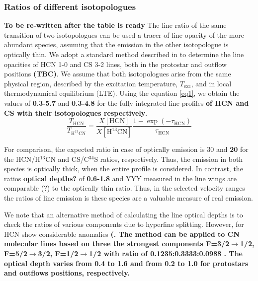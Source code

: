 \documentclass{aa}
\begin{document}
\subsubsection{Ratios of different isotopologues}
\textbf{To be re-written after the table is ready} 
The line ratio of the same transition of two isotopologues can be used a tracer of 
line opacity of the more abundant species, assuming that the emission in the 
other isotopologue is optically thin. We adopt a standard method described in \citep{Gol84} 
to determine the line opacities of HCN 1-0 and CS 3-2 lines, both in the protostar 
and outflow positions \textbf{(TBC)}. We assume that both isotopologues arise from the 
same physical region, described by the excitation temperature, $T_\mathrm{exc}$, and 
in local thermodynamical equilibrium (LTE). Using the equation \ref{eq1}, we obtain
the values of \textbf{0.3-5.7} and \textbf{0.3-4.8} for the fully-integrated line profiles \textbf{of HCN and CS with their isotopologues respectively}.
\begin{equation} 
\label{eq1} \frac{T_{\mathrm{HCN}}}{T_{\mathrm{H^{13}CN}}} =
\frac{X[\mathrm{HCN}]}{X[\mathrm{H^{13}CN}]} \frac
{1-\exp(-\tau_{\mathrm{HCN}})}{\tau_{\mathrm{HCN}}} 
\end{equation} 

For comparison, the expected ratio in case of optically emission is 30 and \textbf{20} for 
the HCN/H$^{13}$CN \citep{Dan13} and CS/C$^{34}$S \textbf{\citep{Ter10}} ratios, respectively. Thus, 
the emission in both species is optically thick, when the entire profile is considered.
In contrast, the ratios \textbf{optical depths?} of \textbf{0.6-1.8} and YYY measured in the line wings are comparable (?) to 
the optically thin ratio. Thus, in the selected velocity ranges the ratios of line emission
is these species are a valuable measure of real emission. 

We note that an alternative method of calculating the line optical depths is to check 
the ratios of various components due to hyperfine splitting. However, for HCN show 
considerable anomalies \textbf{(\citep{Lou12}. The method can be applied to CN molecular lines based on three the strongest components F=3/2$\rightarrow$1/2, F=5/2$\rightarrow$3/2, F=1/2$\rightarrow$1/2 with ratio of 0.1235:0.3333:0.0988 \citep{Ska83}. The optical depth varies from 0.4 to 1.6 and from 0.2 to 1.0 for protostars and outflows positions, respectively. }
\end{document}

